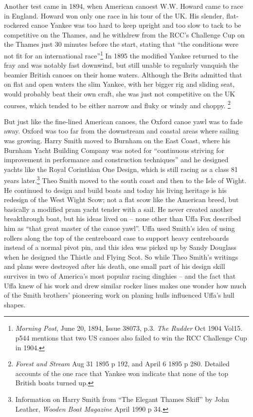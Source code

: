 \documentclass[
  letterpaper,
]{scrbook}
\begin{document}
Another test came in 1894, when American canoest W.W. Howard came to
race in England. Howard won only one race in his tour of the UK. His
slender, flat-rockered canoe Yankee was too hard to keep upright and too
slow to tack to be competitive on the Thames, and he withdrew from the
RCC's Challenge Cup on the Thames just 30 minutes before the start,
stating that ``the conditions were not fit for an international
race''\footnote{\emph{Morning Post}, June 20, 1894, Issue 38073, p.3.
  \emph{The Rudder} Oct 1904 Vol15. p544 mentions that two US canoes
  also failed to win the RCC Challenge Cup in 1904.} In 1895 the
modified Yankee returned to the fray and was notably fast downwind, but
still unable to regularly vanquish the beamier British canoes on their
home waters. Although the Brits admitted that on flat and open waters
the slim Yankee, with her bigger rig and sliding seat, would probably
beat their own craft, she was just not competitive on the UK courses,
which tended to be either narrow and fluky or windy and choppy.
\footnote{\emph{Forest and Stream} Aug 31 1895 p 192, and April 6 1895 p
  280. Detailed accounts of the one race that Yankee won indicate that
  none of the top British boats turned up.}

But just like the fine-lined American canoes, the Oxford canoe yawl was
to fade away. Oxford was too far from the downstream and coastal areas
where sailing was growing. Harry Smith moved to Burnham on the East
Coast, where his Burnham Yacht Building Company was noted for
``continuous striving for improvement in performance and construction
techniques'' and he designed yachts like the Royal Corinthian One
Design, which is still racing as a class 81 years later.\footnote{Information
  on Harry Smith from ``The Elegant Thames Skiff'' by John Leather,
  \emph{Wooden Boat Magazine} April 1990 p 34.} Theo Smith moved to the
south coast and then to the Isle of Wight. He continued to design and
build boats and today his living heritage is his redesign of the West
Wight Scow; not a flat scow like the American breed, but basically a
modified pram yacht tender with a sail. He never created another
breakthrough boat, but his ideas lived on -- none other than Uffa Fox
described him as ``that great master of the canoe yawl''. Uffa used
Smith's idea of using rollers along the top of the centreboard case to
support heavy centreboards instead of a normal pivot pin, and this idea
was picked up by Sandy Douglass when he designed the Thistle and Flying
Scot. So while Theo Smith's writings and plans were destroyed after his
death, one small part of his design skill survives in two of America's
most popular racing dinghies -- and the fact that Uffa knew of his work
and drew similar rocker lines makes one wonder how much of the Smith
brothers' pioneering work on planing hulls influenced Uffa's hull
shapes.
\end{document}
